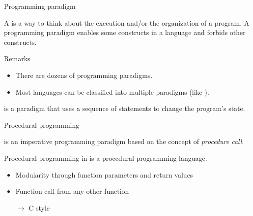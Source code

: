 \begin{frame}{Programming paradigm}{}
  \begin{definition}
    A  is a way to think about the execution and/or the organization of a program. A programming paradigm enables some constructs in a language and forbids other constructs.
  \end{definition}

  \begin{block}{Remarks}
    \begin{itemize}
    \item
      There are dozens of programming paradigms.
    \item
      Most languages can be classified into multiple paradigms (like \CCLang).
    \end{itemize}
  \end{block}

  \begin{example}
     is a paradigm that uses a sequence of statements to change the program's state.
  \end{example}
\end{frame}

\begin{frame}{Procedural programming}{}
  \begin{definition}
     is an imperative programming paradigm based on the concept of \emph{procedure call}.
  \end{definition}
  \begin{block}{Procedural programming in \CCLang}
    \CCLang is a procedural programming language.
    \begin{itemize}
    \item
      Modularity through function parameters and return values
    \item
      Function call from any other function
    \item[$\to$]
      C style
    \end{itemize}
  \end{block}
\end{frame}

